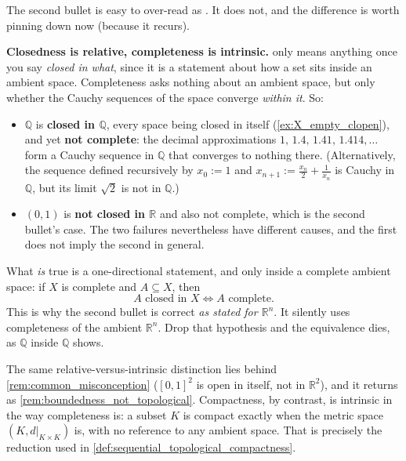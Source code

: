 \begin{remark}
\label{rem:complete_vs_closed}
The second bullet is easy to over-read as . It does not, and the
difference is worth pinning down now (because it recurs).

\textbf{Closedness is relative, completeness is intrinsic.}  only means anything once
you say \emph{closed in what}, since it is a statement about how a set sits inside an ambient
space. Completeness asks nothing about an ambient space, but only whether the Cauchy sequences of
the space converge \emph{within it}. So:
\begin{itemize}
  \item $\mathbb{Q}$ is \textbf{closed in $\mathbb{Q}$}, every space being closed in itself
    (\cref{ex:X_empty_clopen}), and yet \textbf{not complete}: the decimal approximations
    $1,\,1.4,\,1.41,\,1.414,\dots$ form a Cauchy sequence in $\mathbb{Q}$ that converges to nothing there.
    (Alternatively, the sequence defined recursively by $x_0 := 1$ and $x_{n+1} := \frac{x_n}{2} + \frac{1}{x_n}$
    is Cauchy in $\mathbb{Q}$, but its limit $\sqrt{2}$ is not in $\mathbb{Q}$.)
  \item $(0,1)$ is \textbf{not closed in $\mathbb{R}$} and also not complete, which is the
    second bullet's case. The two failures nevertheless have different causes, and the first does
    not imply the second in general.
\end{itemize}

What \emph{is} true is a one-directional statement, and only inside a complete ambient space:
if $X$ is complete and $A \subseteq X$, then
\[A \text{ closed in } X \iff A \text{ complete}.\]
This is why the second bullet is correct \emph{as stated for $\mathbb{R}^n$}. It silently uses
completeness of the ambient $\mathbb{R}^n$. Drop that hypothesis and the equivalence dies, as
$\mathbb{Q}$ inside $\mathbb{Q}$ shows.

The same relative-versus-intrinsic distinction lies behind \cref{rem:common_misconception}
($[0,1]^2$ is open in itself, not in $\mathbb{R}^2$), and it returns as
\cref{rem:boundedness_not_topological}. Compactness, by contrast, is intrinsic in the way
completeness is: a subset $K$ is compact exactly when the metric space $(K, d|_{K\times K})$ is,
with no reference to any ambient space. That is precisely the reduction used in
\cref{def:sequential_topological_compactness}.
\end{remark}

